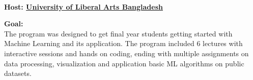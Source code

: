 \\
\begin{tightitemize}
\item {\bf Host: \href{https://ulab.edu.bd/}{University of Liberal Arts Bangladesh}}
\item {\bf Goal: } \\
	The program was designed to get final year students getting started with Machine Learning and its application. 
	The program included 6 lectures with interactive sessions and hands on coding, ending with multiple assignments on 
	data processing, visualization and application basic ML algorithms on public datasets.
\end{tightitemize}

\sectionspace
